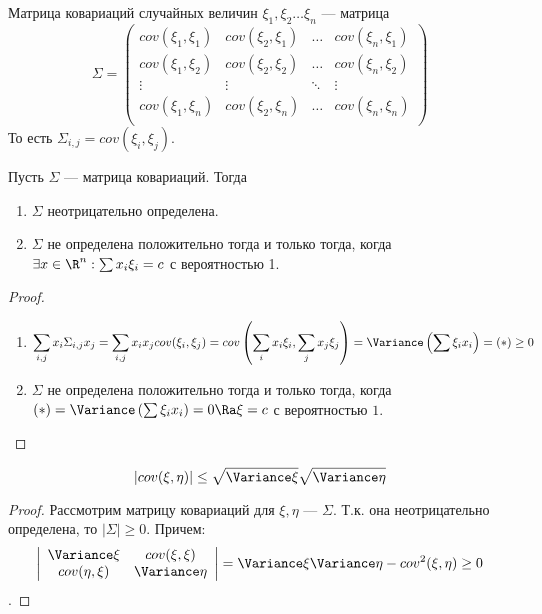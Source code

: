 \begin{definition}
    Матрица ковариаций случайных величин \(\xi_1, \xi_2 \dots \xi_n\) --- матрица
    \[\Sigma = \left(\begin{array}{cccc}
        cov(\xi_1, \xi_1) & cov(\xi_2, \xi_1) & \dots & cov(\xi_n, \xi_1) \\
        cov(\xi_1, \xi_2) & cov(\xi_2, \xi_2) & \dots & cov(\xi_n, \xi_2) \\
        \vdots & \vdots & \ddots & \vdots \\
        cov(\xi_1, \xi_n) & cov(\xi_2, \xi_n) & \dots & cov(\xi_n, \xi_n) \\
    \end{array}\right)\]
    То есть \(\Sigma_{i, j} = cov(\xi_i, \xi_j)\).
\end{definition}

\begin{proposition}
    Пусть \(\Sigma\) --- матрица ковариаций. Тогда
    \begin{enumerate}
        \item \(\Sigma\) неотрицательно определена.
        \item \(\Sigma\) не определена положительно тогда и только тогда, когда \(\exists x \in \R^n: \sum x_i\xi_i = c\) с вероятностью 1.
    \end{enumerate}
\end{proposition}
\begin{proof}
    \begin{enumerate}
        \item \[\sum_{i, j}x_i\Sigma_{i, j}x_j = \sum_{i, j} x_ix_j cov(\xi_i, \xi_j) = cov\left(\sum_i x_i\xi_i, \sum_j x_j\xi_j\right) = \Variance \left(\sum \xi_i x_i\right) = (*) \ge 0\]
        \item \(\Sigma\) не определена положительно тогда и только тогда, когда \((*) = \Variance \left(\sum \xi_i x_i\right) = 0 \Ra \xi = c\) с вероятностью \(1\).
    \end{enumerate}
\end{proof}

\begin{proposition}
    \[|cov(\xi, \eta)| \le \sqrt{\Variance \xi}\sqrt{\Variance \eta}\]
\end{proposition}
\begin{proof}
    Рассмотрим матрицу ковариаций для \(\xi, \eta\) --- \(\Sigma\). Т.к. она неотрицательно определена, то \(|\Sigma| \ge 0\). Причем:
    \[\left|\begin{array}{cc}
        \Variance \xi & cov(\xi, \xi) \\ 
        cov(\eta, \xi) & \Variance \eta \\ 
    \end{array}\right| = \Variance \xi \Variance \eta - cov^2(\xi, \eta)\ge 0\].
\end{proof}
